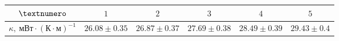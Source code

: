 \begin{tabular}{|c|c|c|c|c|c|}
  \hline
  $\textnumero$ & $1$ & $2$ & $3$ & $4$ & $5$ \\ \hline
  $\kappa,\ мВт \cdot (К \cdot м)^{-1}$ & $26.08 \pm 0.35$ & $26.87 \pm 0.37$ & $27.69 \pm 0.38$ & $28.49 \pm 0.39$ & $29.43 \pm 0.4$\\ \hline
\end{tabular}